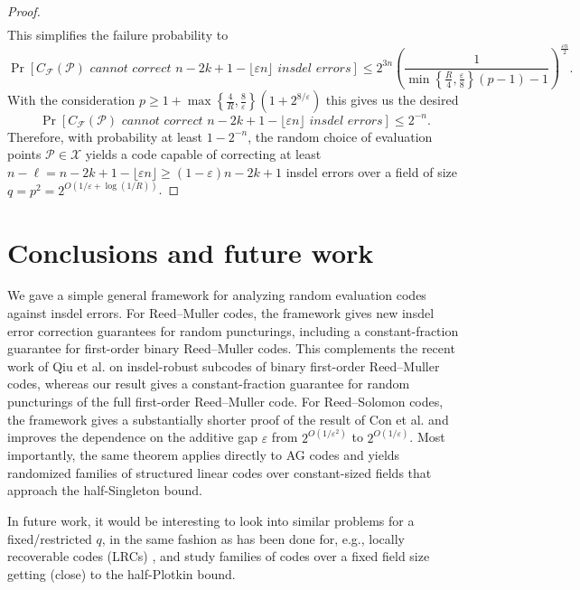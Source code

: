 \documentclass[draft, onecolumn, 11pt]{IEEEtran}
\begin{document}
\begin{proof}
\begin{align*}
    \end{align*}
    This simplifies the failure probability to 
    $$\Pr[C_{\mathcal{F}}(\mathcal{P}) \textit{ cannot correct $n-2k + 1 - \lfloor \varepsilon n \rfloor$ insdel errors}] \leq 2^{3n}\left(\frac{1}{\min\left\lbrace \frac{R}{4}, \frac{\varepsilon}{8}\right\rbrace(p-1)-1}\right)^{\frac{\varepsilon n}{2}}.$$
    With the consideration $p \geq 1 + \max\left\lbrace \frac{4}{R}, \frac{8}{\varepsilon}\right\rbrace \left(1 +2^{8/\varepsilon}\right)$ this gives us the desired
    $$\Pr[C_{\mathcal{F}}(\mathcal{P}) \textit{ cannot correct $n-2k + 1 - \lfloor \varepsilon n \rfloor$ insdel errors}] \leq 2^{-n}.$$
    Therefore, with probability at least $1-2^{-n}$, the random choice of evaluation points $\mathcal{P} \in \mathcal{X}$ yields a code capable of correcting at least $n-\ell = n-2k+1-\lfloor\varepsilon n\rfloor \geq (1 - \varepsilon)n - 2k + 1$ insdel errors over a field of size $q  = p^2= 2^{O(1/\varepsilon + \log(1/R))}$.
\end{proof}

\section{Conclusions and future work}
We gave a simple general framework for analyzing random evaluation codes against insdel errors. For Reed--Muller codes, the framework gives new insdel error correction guarantees for random puncturings, including a constant-fraction guarantee for first-order binary Reed--Muller codes. This complements the recent work of Qiu et al. \cite{qiu2026binary} on insdel-robust subcodes of binary first-order Reed--Muller codes, whereas our result gives a constant-fraction guarantee for random puncturings of the full first-order Reed--Muller code. For Reed--Solomon codes, the framework gives a substantially shorter proof of the result of Con et al.\cite{con2024randomRS} and improves the dependence on the additive gap $\varepsilon$ from $2^{O(1/\varepsilon^2)}$ to $2^{O(1/\varepsilon)}$. Most importantly, the same theorem applies directly to AG codes and yields randomized families of structured linear codes over constant-sized fields that approach the half-Singleton bound.

In future work, it would be interesting to look into similar problems for a fixed/restricted $q$, in the same fashion as has been done for, e.g., locally recoverable codes (LRCs) \cite{cadambe2015localbound,grezet2019alphabet,gruica2023duallocal}, and study families of codes over a fixed field size getting (close) to the half-Plotkin  bound. 
\end{document}
